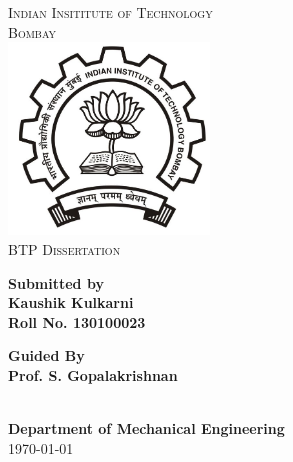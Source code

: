 \documentclass[a4paper,12pt]{report}
\begin{document}
\begin{center}
\textsc{\LARGE Indian Insititute of Technology\\[0.2cm]Bombay }\\[1.5cm]
\includegraphics[width=0.4\textwidth]{./iitbblacklogo.jpg}~\\[2cm]
\textsc{\Large BTP Dissertation}\\[1.5cm]
\begin{minipage}{0.4\textwidth}
\begin{flushleft}
\textbf{Submitted by\\Kaushik Kulkarni\\
Roll No. 130100023\\}
\end{flushleft}
\end{minipage}
\begin{minipage}{0.4\textwidth}
\begin{flushright}
\textbf{Guided By\\Prof. S. Gopalakrishnan}
\end{flushright}
\end{minipage}
\\[1.5cm]
{\large \textbf{Department of Mechanical Engineering}}\\[0.5cm]
{\large \today}\\[0.5cm]
\end{center}
\end{document}
